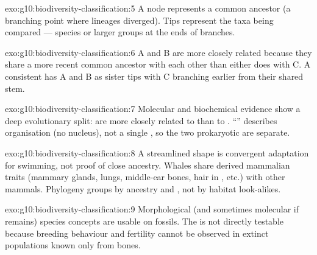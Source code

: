 \begin{solution}{exo:g10:biodiversity-classification:5}
A node represents a common ancestor (a branching point where lineages
diverged). Tips represent the taxa being compared --- species or larger groups
at the ends of branches.
\end{solution}

\begin{solution}{exo:g10:biodiversity-classification:6}
A and B are more closely related because they share a more recent common
ancestor with each other than either does with C. A consistent  has
A and B as sister tips with C branching earlier from their shared stem.
\end{solution}

\begin{solution}{exo:g10:biodiversity-classification:7}
Molecular and biochemical evidence show a deep evolutionary split:  are
more closely related to  than to . ``'' describes
 organisation (no nucleus), not a single , so the two prokaryotic
 are separate.
\end{solution}

\begin{solution}{exo:g10:biodiversity-classification:8}
A streamlined shape is convergent adaptation for swimming, not proof of close
ancestry. Whales share derived mammalian traits (mammary glands, lungs,
middle-ear bones, hair in , etc.) with other mammals. Phylogeny
groups by ancestry and , not by habitat look-alikes.
\end{solution}

\begin{solution}{exo:g10:biodiversity-classification:9}
Morphological (and sometimes molecular if  remains) species concepts are
usable on fossils. The  is not directly testable
because breeding behaviour and fertility cannot be observed in extinct
populations known only from bones.
\end{solution}

